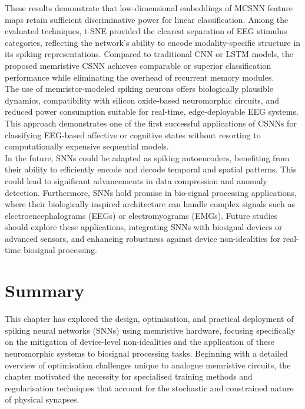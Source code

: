 \noindent These results demonstrate that low-dimensional embeddings of MCSNN feature maps retain sufficient discriminative power for linear classification. Among the evaluated techniques, t-SNE provided the clearest separation of EEG stimulus categories, reflecting the network's ability to encode modality-specific structure in its spiking representations. Compared to traditional CNN or LSTM models, the proposed memristive CSNN achieves comparable or superior classification performance while eliminating the overhead of recurrent memory modules. \\

\noindent The use of memristor-modeled spiking neurons offers biologically plausible dynamics, compatibility with silicon oxide-based neuromorphic circuits, and reduced power consumption suitable for real-time, edge-deployable EEG systems. This approach demonstrates one of the first successful applications of CSNNs for classifying EEG-based affective or cognitive states without resorting to computationally expensive sequential models.\\

\noindent In the future, SNNs could be adapted as spiking autoencoders, benefiting from their ability to efficiently encode and decode temporal and spatial patterns. This could lead to significant advancements in data compression and anomaly detection. Furthermore, SNNs hold promise in bio-signal processing applications, where their biologically inspired architecture can handle complex signals such as electroencephalograms (EEGs) or electromyograms (EMGs). Future studies should explore these applications, integrating SNNs with biosignal devices or advanced sensors, and enhancing robustness against device non-idealities for real-time biosignal processing.

\section[Summary]{Summary}

\noindent This chapter has explored the design, optimisation, and practical deployment of spiking neural networks (SNNs) using memristive hardware, focusing specifically on the mitigation of device-level non-idealities and the application of these neuromorphic systems to biosignal processing tasks. Beginning with a detailed overview of optimisation challenges unique to analogue memristive circuits, the chapter motivated the necessity for specialised training methods and regularisation techniques that account for the stochastic and constrained nature of physical synapses. \\

